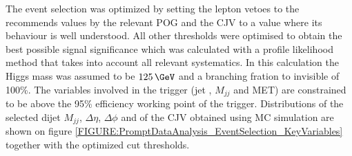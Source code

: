 The event selection was optimized by setting the lepton vetoes to the recommends values by the relevant \gls{POG} and the \gls{CJV} to a value where its behaviour is well understood. All other thresholds were optimised to obtain the best possible signal significance which was calculated with a profile likelihood method that takes into account all relevant systematics. In this calculation the Higgs mass was assumed to be $125\,\GeV$ and a branching fration to invisible of 100\%. The variables involved in the trigger (jet \pt, $M_{jj}$ and \gls{MET}) are constrained to be above the 95\% efficiency working point of the trigger. Distributions of the selected dijet $M_{jj}$, $\Delta\eta$, $\Delta\phi$ and of the \gls{CJV} obtained using \gls{MC} simulation are shown on figure \ref{FIGURE:PromptDataAnalysis_EventSelection_KeyVariables} together with the optimized cut thresholds.

